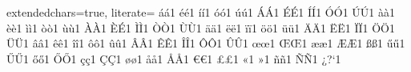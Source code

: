{  extendedchars=true,              %
  literate=
  {á}{{\'a}}1 {é}{{\'e}}1 {í}{{\'i}}1 {ó}{{\'o}}1 {ú}{{\'u}}1
  {Á}{{\'A}}1 {É}{{\'E}}1 {Í}{{\'I}}1 {Ó}{{\'O}}1 {Ú}{{\'U}}1
  {à}{{\`a}}1 {è}{{\`e}}1 {ì}{{\`i}}1 {ò}{{\`o}}1 {ù}{{\`u}}1
  {À}{{\`A}}1 {È}{{\'E}}1 {Ì}{{\`I}}1 {Ò}{{\`O}}1 {Ù}{{\`U}}1
  {ä}{{\"a}}1 {ë}{{\"e}}1 {ï}{{\"i}}1 {ö}{{\"o}}1 {ü}{{\"u}}1
  {Ä}{{\"A}}1 {Ë}{{\"E}}1 {Ï}{{\"I}}1 {Ö}{{\"O}}1 {Ü}{{\"U}}1
  {â}{{\^a}}1 {ê}{{\^e}}1 {î}{{\^i}}1 {ô}{{\^o}}1 {û}{{\^u}}1
  {Â}{{\^A}}1 {Ê}{{\^E}}1 {Î}{{\^I}}1 {Ô}{{\^O}}1 {Û}{{\^U}}1
  {œ}{{\oe}}1 {Œ}{{\OE}}1 {æ}{{\ae}}1 {Æ}{{\AE}}1 {ß}{{\ss}}1
  {ű}{{\H{u}}}1 {Ű}{{\H{U}}}1 {ő}{{\H{o}}}1 {Ő}{{\H{O}}}1
  {ç}{{\c c}}1 {Ç}{{\c C}}1 {ø}{{\o}}1 {å}{{\r a}}1 {Å}{{\r A}}1
  {€}{{\euro}}1 {£}{{\pounds}}1 {«}{{\guillemotleft}}1
  {»}{{\guillemotright}}1 {ñ}{{\~n}}1 {Ñ}{{\~N}}1 {¿}{{?`}}1
}
